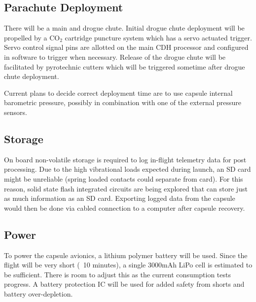 \documentclass{article}
\begin{document}
\subsection{Parachute Deployment}
There will be a main and drogue chute. Initial drogue chute deployment will be propelled by a CO$_2$ cartridge puncture system which has a servo actuated trigger. Servo control signal pins are allotted on the main CDH processor and configured in software to trigger when necessary. Release of the drogue chute will be facilitated by pyrotechnic cutters which will be triggered sometime after drogue chute deployment.

Current plans to decide correct deployment time are to use capsule internal barometric pressure, possibly in combination with one of the external pressure sensors.


\subsection{Storage}
On board non-volatile storage is required to log in-flight telemetry data for post processing. Due to the high vibrational loads expected during launch, an SD card might be unreliable (spring loaded contacts could separate from card). For this reason, solid state flash integrated circuits are being explored that can store just as much information as an SD card. Exporting logged data from the capsule would then be done via cabled connection to a computer after capsule recovery.


\subsection{Power}
To power the capsule avionics, a lithium polymer battery will be used. Since the flight will be very short (~10 minutes), a single 3000mAh LiPo cell is estimated to be sufficient. There is room to adjust this as the current consumption tests progress. A battery protection IC will be used for added safety from shorts and battery over-depletion.


\end{document}
